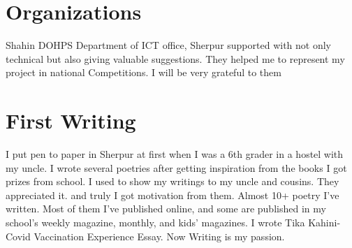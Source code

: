 \documentclass{article}
\begin{document}
\section{Organizations} Shahin DOHPS
Department of ICT office, Sherpur supported with not only technical but also giving valuable suggestions. They helped me to represent my project in national Competitions. I will be very grateful to them

\section{First Writing} 
I put pen to paper in Sherpur at first when I was a 6th grader in a hostel with my uncle. I wrote several poetries after getting inspiration from the books I got prizes from school. I used to show my writings to my uncle and cousins. They appreciated it. and truly I got motivation from them. Almost 10+ poetry I've written. Most of them I've published online, and some are published in my school's weekly magazine, monthly, and kids' magazines. I wrote Tika Kahini- Covid Vaccination Experience Essay. Now Writing is my passion.
\end{document}
